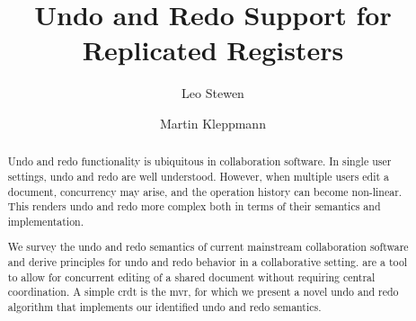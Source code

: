 \documentclass[sigplan,natbib=false,review]{acmart}
\begin{document}
\title{Undo and Redo Support for Replicated Registers}

\author{Leo Stewen}

\author{Martin Kleppmann}


\begin{abstract}
Undo and redo functionality is ubiquitous in collaboration software.
In single user settings, undo and redo are well understood.
However, when multiple users edit a document,
concurrency may arise, and the operation history can become non-linear.
This renders undo and redo more complex
both in terms of their semantics and implementation.

We survey the undo and redo semantics of current mainstream collaboration software
and derive principles for undo and redo behavior in a collaborative setting.
 are a tool to allow for concurrent editing of a shared document without
requiring central coordination.
A simple \acrshort{crdt} is the \acrlong{mvr}, for which we present a novel
undo and redo algorithm that implements our identified undo and redo semantics.
\end{abstract}
\end{document}
